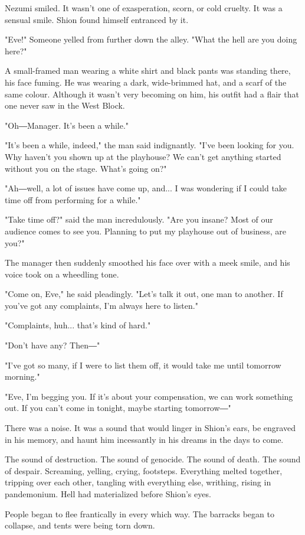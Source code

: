 Nezumi smiled. It wasn't one of exasperation, scorn, or cold cruelty. It
was a sensual smile. Shion found himself entranced by it.

"Eve!" Someone yelled from further down the alley. "What the hell are
you doing here?"

A small-framed man wearing a white shirt and black pants was standing
there, his face fuming. He was wearing a dark, wide-brimmed hat, and a
scarf of the same colour. Although it wasn't very becoming on him, his
outfit had a flair that one never saw in the West Block.

"Oh―Manager. It's been a while."

"It's been a while, indeed," the man said indignantly. "I've been
looking for you. Why haven't you shown up at the playhouse? We can't get
anything started without you on the stage. What's going on?"

"Ah―well, a lot of issues have come up, and... I was wondering if I
could take time off from performing for a while."

"Take time off?" said the man incredulously. "Are you insane? Most of
our audience comes to see you. Planning to put my playhouse out of
business, are you?"

The manager then suddenly smoothed his face over with a meek smile, and
his voice took on a wheedling tone.

"Come on, Eve," he said pleadingly. "Let's talk it out, one man to
another. If you've got any complaints, I'm always here to listen."

"Complaints, huh... that's kind of hard."

"Don't have any? Then―"

"I've got so many, if I were to list them off, it would take me until
tomorrow morning."

"Eve, I'm begging you. If it's about your compensation, we can work
something out. If you can't come in tonight, maybe starting tomorrow―"

There was a noise. It was a sound that would linger in Shion's ears, be
engraved in his memory, and haunt him incessantly in his dreams in the
days to come.

The sound of destruction. The sound of genocide. The sound of death. The
sound of despair. Screaming, yelling, crying, footsteps. Everything
melted together, tripping over each other, tangling with everything
else, writhing, rising in pandemonium. Hell had materialized before
Shion's eyes.

People began to flee frantically in every which way. The barracks began
to collapse, and tents were being torn down.

